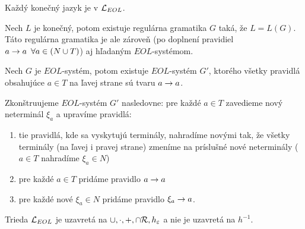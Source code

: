 \begin{veta}
  Každý konečný jazyk je v $\mathcal{L}_{EOL}$.
\end{veta}

\begin{dokaz}
  Nech $L$ je konečný, potom existuje regulárna gramatika $G$ taká,
  že $L = L(G)$. Táto regulárna gramatika je ale zároveň (po doplnení
  pravidiel $a\rightarrow a \enspace \forall a \in (N \cup T)$)
  aj hľa\-da\-ným $EOL$-systémom.
\end{dokaz}

\begin{lema}
  \label{norm_tvarEOL}
  Nech $G$ je $EOL$-systém, potom existuje
  $EOL$-systém $G'$, ktorého všetky pravidlá obsahujúce $a \in T$ na
  ľavej strane sú tvaru $a \rightarrow a$.
\end{lema}

\begin{dokaz}
  Zkonštruujeme $EOL$-systém $G'$ nasledovne: pre každé $a \in T$
  zavedieme nový neterminál $\xi_a$ a upravíme pravidlá:
  \begin{enumerate}
    \item tie pravidlá, kde sa vyskytujú terminály, nahradíme novými tak,
      že všetky terminály (na ľavej i pravej strane) zmeníme na
      príslušné nové neterminály ($a \in T$ nahradíme $\xi_a \in N$)
    \item pre každé $a\in T$ pridáme pravidlo $a\rightarrow a$
    \item pre každé nové $\xi_a \in N$ pridáme pravidlo
      $\xi_a \rightarrow a$.
  \end{enumerate}
\end{dokaz}

\begin{veta}
  Trieda $\mathcal{L}_{EOL}$ je uzavretá na
  $\cup, \cdot, +, \cap \mathcal{R}, h_{\varepsilon}$ a nie je uzavretá
  na $h^{-1}$.
\end{veta}

